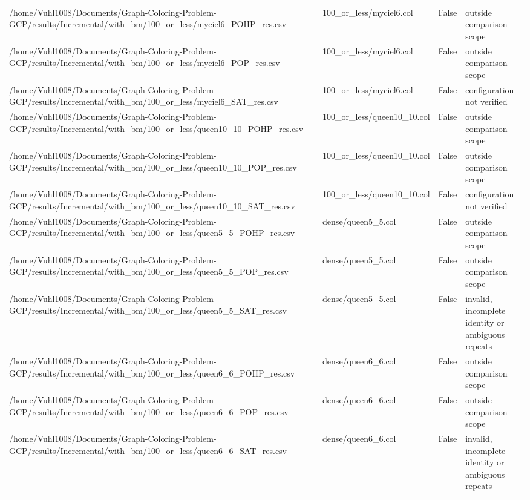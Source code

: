 \begin{table}[htbp]
\begin{tabular}{llll}
/home/Vuhl1008/Documents/Graph-Coloring-Problem-GCP/results/Incremental/with\_bm/100\_or\_less/myciel6\_POHP\_res.csv & 100\_or\_less/myciel6.col & False & outside comparison scope \\
/home/Vuhl1008/Documents/Graph-Coloring-Problem-GCP/results/Incremental/with\_bm/100\_or\_less/myciel6\_POP\_res.csv & 100\_or\_less/myciel6.col & False & outside comparison scope \\
/home/Vuhl1008/Documents/Graph-Coloring-Problem-GCP/results/Incremental/with\_bm/100\_or\_less/myciel6\_SAT\_res.csv & 100\_or\_less/myciel6.col & False & configuration not verified \\
/home/Vuhl1008/Documents/Graph-Coloring-Problem-GCP/results/Incremental/with\_bm/100\_or\_less/queen10\_10\_POHP\_res.csv & 100\_or\_less/queen10\_10.col & False & outside comparison scope \\
/home/Vuhl1008/Documents/Graph-Coloring-Problem-GCP/results/Incremental/with\_bm/100\_or\_less/queen10\_10\_POP\_res.csv & 100\_or\_less/queen10\_10.col & False & outside comparison scope \\
/home/Vuhl1008/Documents/Graph-Coloring-Problem-GCP/results/Incremental/with\_bm/100\_or\_less/queen10\_10\_SAT\_res.csv & 100\_or\_less/queen10\_10.col & False & configuration not verified \\
/home/Vuhl1008/Documents/Graph-Coloring-Problem-GCP/results/Incremental/with\_bm/100\_or\_less/queen5\_5\_POHP\_res.csv & dense/queen5\_5.col & False & outside comparison scope \\
/home/Vuhl1008/Documents/Graph-Coloring-Problem-GCP/results/Incremental/with\_bm/100\_or\_less/queen5\_5\_POP\_res.csv & dense/queen5\_5.col & False & outside comparison scope \\
/home/Vuhl1008/Documents/Graph-Coloring-Problem-GCP/results/Incremental/with\_bm/100\_or\_less/queen5\_5\_SAT\_res.csv & dense/queen5\_5.col & False & invalid, incomplete identity or ambiguous repeats \\
/home/Vuhl1008/Documents/Graph-Coloring-Problem-GCP/results/Incremental/with\_bm/100\_or\_less/queen6\_6\_POHP\_res.csv & dense/queen6\_6.col & False & outside comparison scope \\
/home/Vuhl1008/Documents/Graph-Coloring-Problem-GCP/results/Incremental/with\_bm/100\_or\_less/queen6\_6\_POP\_res.csv & dense/queen6\_6.col & False & outside comparison scope \\
/home/Vuhl1008/Documents/Graph-Coloring-Problem-GCP/results/Incremental/with\_bm/100\_or\_less/queen6\_6\_SAT\_res.csv & dense/queen6\_6.col & False & invalid, incomplete identity or ambiguous repeats \\

\end{tabular}
\end{table}
